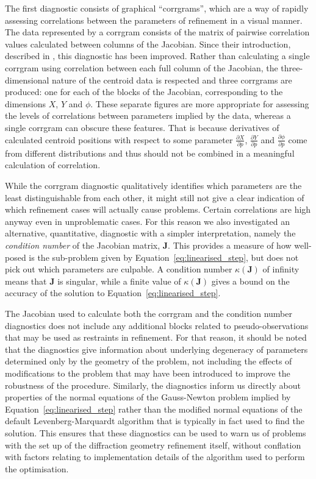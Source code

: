 \documentclass[preprint]{iucr}
\newcommand{\mat}[1]{\mathbf{#1}}
\newcommand{\pder}[2][]{\frac{\partial#1}{\partial#2}}
\begin{document}
The first diagnostic consists of graphical ``corrgrams'', which are a way of
rapidly assessing correlations between the parameters of refinement in a visual
manner. The data represented by a corrgram consists of the matrix of pairwise
correlation values calculated between columns of the Jacobian. Since their
introduction, described in , this diagnostic has been
improved. Rather than calculating a single corrgram using correlation between
each full column of the Jacobian, the three-dimensional nature of the centroid
data is respected and three corrgrams are produced: one for each of the blocks
of the Jacobian, corresponding to the dimensions $X$, $Y$ and $\phi$. These
separate figures are more appropriate for assessing the levels of correlations
between parameters implied by the data, whereas a single corrgram can obscure
these features. That is because derivatives of calculated centroid positions
with respect to some parameter $\pder[X]{p}$, $\pder[Y]{p}$ and
$\pder[\phi]{p}$ come from different distributions and thus should not be
combined in a meaningful calculation of correlation.

While the corrgram diagnostic qualitatively identifies which parameters are the
least distinguishable from each other, it might still not give a clear
indication of which refinement cases will actually cause problems. Certain
correlations are high anyway even in unproblematic cases. For this reason we
also investigated an alternative, quantitative, diagnostic with a simpler
interpretation, namely the \emph{condition number} of the Jacobian matrix,
$\mat{J}$. This provides a measure of how well-posed is the sub-problem given
by Equation~\ref{eq:linearised_step}, but does not pick out which parameters
are culpable. A condition number $\kappa \left( \mat{J} \right)$ of infinity
means that $\mat{J}$ is singular, while a finite value of $\kappa \left(
\mat{J} \right)$ gives a bound on the accuracy of the solution to
Equation~\ref{eq:linearised_step}.

The Jacobian used to calculate both the corrgram and the condition number
diagnostics does not include any additional blocks related to
pseudo-observations that may be used as restraints in refinement. For that
reason, it should be noted that the diagnostics give information about
underlying degeneracy of parameters determined only by the geometry of the
problem, not including the effects of modifications to the problem that may
have been introduced to improve the robustness of the procedure. Similarly, the
diagnostics inform us directly about properties of the normal equations of the
Gauss-Newton problem implied by Equation~\ref{eq:linearised_step} rather than
the modified normal equations of the default Levenberg-Marquardt algorithm that
is typically in fact used to find the solution. This ensures that these
diagnostics can be used to warn us of problems with the set up of the
diffraction geometry refinement itself, without conflation with factors
relating to implementation details of the algorithm used to perform the
optimisation.
\end{document}

